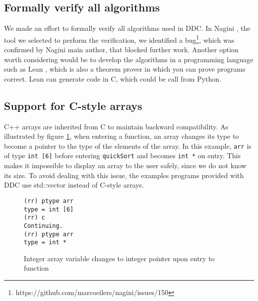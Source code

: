 \subsection{Formally verify all algorithms}
We made an effort to formally verify all algorithms used in DDC.
In Nagini \cite{nagini}, the tool we selected to perform the verification, we identified a bug\footnote{https://github.com/marcoeilers/nagini/issues/150}, which was confirmed by Nagini main author, that blocked further work. 
Another option worth considering would be to develop the algorithms in a programming language such as Lean \cite{lean}, which is also a theorem prover in which you can prove programs correct.
Lean can generate code in C, which could be call from Python.
\subsection{Support for C-style arrays}
C++ arrays are inherited from C to maintain backward compatibility.
As illustrated by figure \ref{fig:array_to_pointer}, when entering a function, an array changes its type to become a pointer to the type of the elements of the array.
In this example, \verb|arr| is of type \verb|int [6]| before entering \verb|quickSort| and becomes \verb|int *| on entry.
This makes it impossible to display an array to the user safely, since we do not know its size.
To avoid dealing with this issue, the examples programs provided with DDC use std::vector instead of C-style arrays.
\begin{figure}[h]
    \centering
    \caption{Integer array variable changes to integer pointer upon entry to function}
    \label{fig:array_to_pointer}
    \begin{verbatim}
(rr) ptype arr
type = int [6]
(rr) c
Continuing.
(rr) ptype arr
type = int *
    \end{verbatim}
\end{figure}

